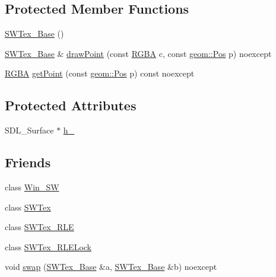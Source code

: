 \subsection*{Protected Member Functions}
\begin{DoxyCompactItemize}
\item 
\mbox{\hyperlink{classrolmodl_1_1_s_w_tex___base_a72c1bf21dc9371fea3f4f232c943576f}{S\+W\+Tex\+\_\+\+Base}} ()
\item 
\mbox{\hyperlink{classrolmodl_1_1_s_w_tex___base}{S\+W\+Tex\+\_\+\+Base}} \& \mbox{\hyperlink{classrolmodl_1_1_s_w_tex___base_a785eac0987fda4840638891dd0192592}{draw\+Point}} (const \mbox{\hyperlink{structrolmodl_1_1_r_g_b_a}{R\+G\+BA}} c, const \mbox{\hyperlink{structrolmodl_1_1geom_1_1_pos}{geom\+::\+Pos}} p) noexcept
\item 
\mbox{\hyperlink{structrolmodl_1_1_r_g_b_a}{R\+G\+BA}} \mbox{\hyperlink{classrolmodl_1_1_s_w_tex___base_a86408f0070ab0703c06825ace24ac883}{get\+Point}} (const \mbox{\hyperlink{structrolmodl_1_1geom_1_1_pos}{geom\+::\+Pos}} p) const noexcept
\end{DoxyCompactItemize}
\subsection*{Protected Attributes}
\begin{DoxyCompactItemize}
\item 
S\+D\+L\+\_\+\+Surface $\ast$ \mbox{\hyperlink{classrolmodl_1_1_s_w_tex___base_a908fa190ddce517e98402cc9d55b1941}{h\+\_\+}}
\end{DoxyCompactItemize}
\subsection*{Friends}
\begin{DoxyCompactItemize}
\item 
class \mbox{\hyperlink{classrolmodl_1_1_s_w_tex___base_ad21e0cba1bfeebe2505d45f8c885808a}{Win\+\_\+\+SW}}
\item 
class \mbox{\hyperlink{classrolmodl_1_1_s_w_tex___base_a3d1245d0f096d44c013059f01b277a92}{S\+W\+Tex}}
\item 
class \mbox{\hyperlink{classrolmodl_1_1_s_w_tex___base_a8d9bdf64a44bae4457e97cb082f21c42}{S\+W\+Tex\+\_\+\+R\+LE}}
\item 
class \mbox{\hyperlink{classrolmodl_1_1_s_w_tex___base_a1d07bb9f2ec1b0a410462817e4dda338}{S\+W\+Tex\+\_\+\+R\+L\+E\+Lock}}
\item 
void \mbox{\hyperlink{classrolmodl_1_1_s_w_tex___base_a8f89877a58a353f571b9e38984370a8c}{swap}} (\mbox{\hyperlink{classrolmodl_1_1_s_w_tex___base}{S\+W\+Tex\+\_\+\+Base}} \&a, \mbox{\hyperlink{classrolmodl_1_1_s_w_tex___base}{S\+W\+Tex\+\_\+\+Base}} \&b) noexcept
\end{DoxyCompactItemize}


